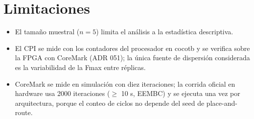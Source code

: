 \section{Limitaciones}

\begin{itemize}
\item El tamaño muestral ($n = 5$) limita el análisis a la estadística descriptiva.
\item El CPI se mide con los contadores del procesador en cocotb y se verifica sobre la FPGA con CoreMark (ADR 051); la única fuente de dispersión considerada es la variabilidad de la Fmax entre réplicas.
\item CoreMark se mide en simulación con diez iteraciones; la corrida oficial en hardware usa 2000 iteraciones ($\geq$ 10 s, EEMBC) y se ejecuta una vez por arquitectura, porque el conteo de ciclos no depende del seed de place-and-route.
\end{itemize}
